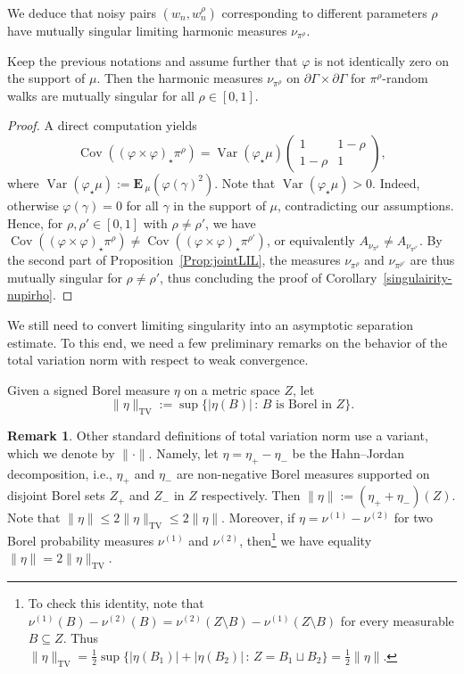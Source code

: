 \documentclass[10pt]{amsart}
\theoremstyle{definition}\newtheorem{defi}[theo]{Definition}\newtheorem{rema}[theo]{Remark}\newtheorem{exam}[theo]{Example}\newtheorem{exem}[theo]{Example}\newtheorem{nota}[theo]{Notation}
\DeclareMathOperator{\TV}{TV}
\DeclareMathOperator{\Var}{Var}
\DeclareMathOperator{\Cov}{Cov}
\newcommand{\f}{\varphi}
\newcommand{\Eb}{\mathbf{E}\,}
\renewcommand{\(}{\left(}
\renewcommand{\)}{\right)}
\begin{document}
We deduce that noisy pairs $(w_{n}, w_{n}^{\rho})$ corresponding to different parameters $\rho$ have mutually singular limiting harmonic measures $\nu_{\pi^{\rho}}$.


\begin{coro}\label{singulairity-nupirho}
Keep the previous notations and assume further that $\f$ is not identically zero on the support of $\mu$. Then the harmonic measures $\nu_{\pi^\rho}$ on $\partial \Gamma \times \partial \Gamma$ for $\pi^\rho$-random walks are mutually singular for all $\rho \in [0, 1]$.
\end{coro}


\begin{proof}
A direct computation yields
\[
\Cov((\f\times \f)_\star\pi^\rho)=\Var (\f_{\star}\mu)
\begin{pmatrix}
1 & 1-\rho\\
1-\rho & 1
\end{pmatrix},
\]
where $\Var (\f_{\star} \mu):=\Eb_{\mu}(\f(\gamma)^2)$. Note that $\Var (\f_{\star} \mu)>0$. Indeed, otherwise $\f(\gamma)=0$ for all $\gamma$ in the support of $\mu$, contradicting our assumptions. Hence, for $\rho, \rho' \in [0, 1]$ with $\rho \neq \rho'$, we have $\Cov((\f\times\f)_\star\pi^\rho) \neq \Cov((\f\times \f)_\star \pi^{\rho'})$, or equivalently $A_{\nu_{\pi^\rho}}\neq A_{\nu_{\pi^{\rho'}}}$. By the second part of Proposition~\ref{Prop:jointLIL}, the measures $\nu_{\pi^\rho}$ and $\nu_{\pi^{\rho'}}$ are thus mutually singular for $\rho\neq \rho'$, thus concluding the proof of Corollary~\ref{singulairity-nupirho}.
\end{proof}

We still need to convert limiting singularity into an asymptotic separation estimate. To this end, we need a few preliminary remarks on the behavior of the total variation norm with respect to weak convergence.

Given a signed Borel measure $\eta$ on a metric space $Z$, let
\[
\|\eta\|_{\TV}:=\sup\{|\eta(B)| \,:\, \text{$B$ is Borel in $Z$}\}.
\]

\begin{rema}\label{Rem:TV}
Other standard definitions of total variation norm use a variant, which we denote by $\|\cdot\|$. Namely,
let $\eta=\eta_+ - \eta_-$ be the Hahn--Jordan decomposition, i.e., $\eta_+$ and $\eta_-$ are non-negative Borel measures supported on disjoint Borel sets $Z_+$ and $Z_-$ in $Z$ respectively. Then $\|\eta\|:=(\eta_+ + \eta_-)(Z)$. Note that $\|\eta\| \leq 2\|\eta\|_{\TV}\leq 2\|\eta\|$. Moreover, if $\eta=\nu^{(1)}-\nu^{(2)}$ for two Borel probability measures $\nu^{(1)}$ and $\nu^{(2)}$, then\footnote{To check this identity, note that $\nu^{(1)}(B)-\nu^{(2)}(B)=\nu^{(2)}(Z\setminus B)-\nu^{(1)}(Z\setminus B)$ for every measurable $B\subseteq Z$. Thus $\|\eta\|_{\TV}=\frac{1}{2}\sup\{|\eta(B_{1})|+|\eta(B_{2})| \, : \, Z=B_{1}\sqcup B_{2}\}= \frac{1}{2}\|\eta\|$. } we have equality $\|\eta\| = 2\|\eta\|_{\TV}$.
\end{rema}
\end{document}
